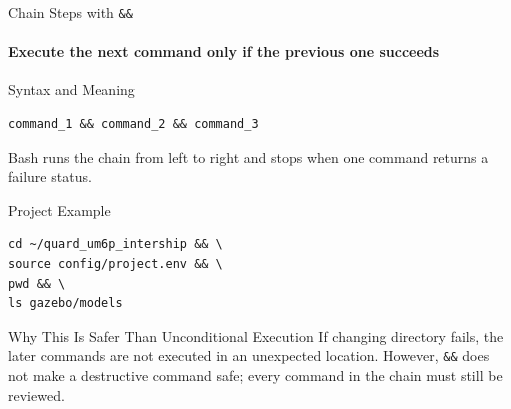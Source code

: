 




\begin{frame}[fragile]{Chain Steps with \texttt{\&\&}}
\framesubtitle{Execute the next command only if the previous one succeeds}

\footnotesize

\begin{block}{Syntax and Meaning}
\begin{verbatim}
command_1 && command_2 && command_3
\end{verbatim}
Bash runs the chain from left to right and stops when one command returns a
failure status.
\end{block}

\begin{exampleblock}{Project Example}
\begin{verbatim}
cd ~/quard_um6p_intership && \
source config/project.env && \
pwd && \
ls gazebo/models
\end{verbatim}
\end{exampleblock}

\begin{alertblock}{Why This Is Safer Than Unconditional Execution}
If changing directory fails, the later commands are not executed in an
unexpected location. However, \texttt{\&\&} does not make a destructive command
safe; every command in the chain must still be reviewed.
\end{alertblock}
\end{frame}

